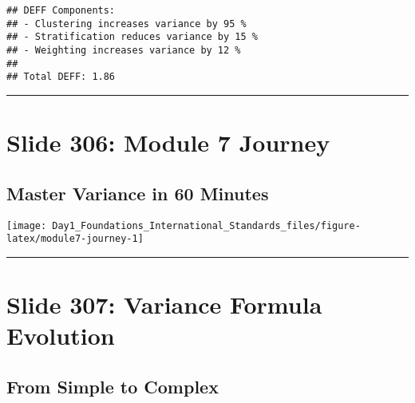 \documentclass[
]{article}
\begin{document}
\begin{verbatim}
## DEFF Components:
## - Clustering increases variance by 95 %
## - Stratification reduces variance by 15 %
## - Weighting increases variance by 12 %
## 
## Total DEFF: 1.86
\end{verbatim}

\begin{center}\rule{0.5\linewidth}{0.5pt}\end{center}

\section{Slide 306: Module 7 Journey}\label{slide-306-module-7-journey}

\subsection{Master Variance in 60
Minutes}\label{master-variance-in-60-minutes}

\texttt{[image: Day1\_Foundations\_International\_Standards\_files/figure-latex/module7-journey-1]}

\begin{center}\rule{0.5\linewidth}{0.5pt}\end{center}

\section{Slide 307: Variance Formula
Evolution}\label{slide-307-variance-formula-evolution}

\subsection{From Simple to Complex}\label{from-simple-to-complex}
\end{document}
